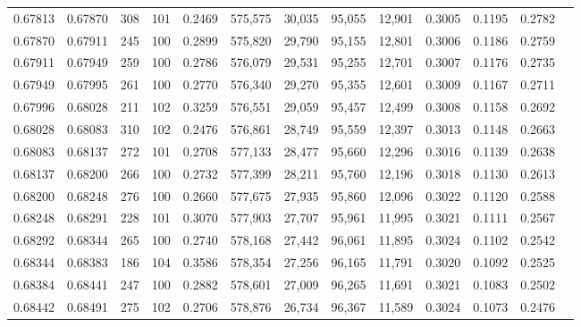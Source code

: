 \begin{tabular}{rrrrrrrrrrrrr}
0.67813 & 0.67870 &   308 & 101 &                                     0.2469 & 575,575 &  30,035 &  95,055 &  12,901 & 0.3005 & 0.1195 & 0.2782 \\
0.67870 & 0.67911 &   245 & 100 &                                     0.2899 & 575,820 &  29,790 &  95,155 &  12,801 & 0.3006 & 0.1186 & 0.2759 \\
0.67911 & 0.67949 &   259 & 100 &                                     0.2786 & 576,079 &  29,531 &  95,255 &  12,701 & 0.3007 & 0.1176 & 0.2735 \\
0.67949 & 0.67995 &   261 & 100 &                                     0.2770 & 576,340 &  29,270 &  95,355 &  12,601 & 0.3009 & 0.1167 & 0.2711 \\
0.67996 & 0.68028 &   211 & 102 &                                     0.3259 & 576,551 &  29,059 &  95,457 &  12,499 & 0.3008 & 0.1158 & 0.2692 \\
0.68028 & 0.68083 &   310 & 102 &                                     0.2476 & 576,861 &  28,749 &  95,559 &  12,397 & 0.3013 & 0.1148 & 0.2663 \\
0.68083 & 0.68137 &   272 & 101 &                                     0.2708 & 577,133 &  28,477 &  95,660 &  12,296 & 0.3016 & 0.1139 & 0.2638 \\
0.68137 & 0.68200 &   266 & 100 &                                     0.2732 & 577,399 &  28,211 &  95,760 &  12,196 & 0.3018 & 0.1130 & 0.2613 \\
0.68200 & 0.68248 &   276 & 100 &                                     0.2660 & 577,675 &  27,935 &  95,860 &  12,096 & 0.3022 & 0.1120 & 0.2588 \\
0.68248 & 0.68291 &   228 & 101 &                                     0.3070 & 577,903 &  27,707 &  95,961 &  11,995 & 0.3021 & 0.1111 & 0.2567 \\
0.68292 & 0.68344 &   265 & 100 &                                     0.2740 & 578,168 &  27,442 &  96,061 &  11,895 & 0.3024 & 0.1102 & 0.2542 \\
0.68344 & 0.68383 &   186 & 104 &                                     0.3586 & 578,354 &  27,256 &  96,165 &  11,791 & 0.3020 & 0.1092 & 0.2525 \\
0.68384 & 0.68441 &   247 & 100 &                                     0.2882 & 578,601 &  27,009 &  96,265 &  11,691 & 0.3021 & 0.1083 & 0.2502 \\
0.68442 & 0.68491 &   275 & 102 &                                     0.2706 & 578,876 &  26,734 &  96,367 &  11,589 & 0.3024 & 0.1073 & 0.2476 \\

\end{tabular}
